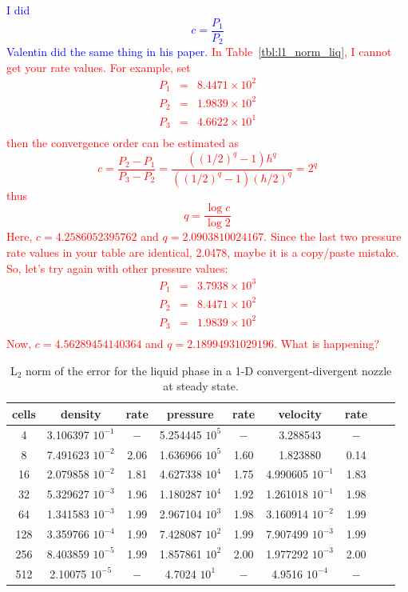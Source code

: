 \documentclass[preprint,10pt]{elsarticle}
\newcommand{\tbl}[1]{Table~\ref{#1}}                     %
\newcommand{\tcr}[1]{\textcolor{red}{#1}}
\newcommand{\tcb}[1]{\textcolor{blue}{#1}}
\begin{document}
%
\tcb{I did 
\begin{equation}
c = \frac{P_1}{P_2}
\end{equation}
Valentin did the same thing in his paper.
}
\tcr{In \tbl{tbl:l1_norm_liq}, I cannot get your rate values. For example, set
\begin{eqnarray*}
P_1 &=& 8.4471 \times 10^{2} \\
P_2 &=& 1.9839 \times 10^{2} \\
P_3 &=& 4.6622 \times 10^{1} \\
\end{eqnarray*}
then the convergence order can be estimated as
\[
c = \frac{P_2-P_1}{P_3-P_2} = \frac{((1/2)^q-1)h^q}{((1/2)^q-1)(h/2)^q}=2^q
\]
thus
\[
q = \frac{\log{c}}{\log{2}}
\]
Here, $c= 4.2586052395762$ and $q=2.0903810024167$. Since the last two pressure rate values in your table are identical, 2.0478, maybe it is a copy/paste mistake. So, let's try again with other pressure values:
\begin{eqnarray*}
P_1 &=& 3.7938 \times 10^{3} \\
P_2 &=& 8.4471 \times 10^{2} \\
P_3 &=& 1.9839 \times 10^{2} \\
\end{eqnarray*}
Now, $c= 4.56289454140364$ and $q=2.18994931029196$. What is happening?
}
%
\begin{table}[H]
\begin{center}
 \caption{\label{tbl:l2_norm_liq} L$_2$ norm of the error for the liquid phase in a 1-D convergent-divergent nozzle at steady state.}
 \begin{tabular}{|c|c|c|c|c|c|c|c|c|}
 \hline
cells& density            & rate & pressure          & rate & velocity           & rate \\ \hline
4    & 3.106397 $10^{-1}$ & $-$  & 5.254445 $10^{5}$ & $-$  & 3.288543           & $-$  \\ \hline
8    & 7.491623 $10^{-2}$ & 2.06 & 1.636966 $10^{5}$ & 1.60 & 1.823880           & 0.14 \\ \hline
16   & 2.079858 $10^{-2}$ & 1.81 & 4.627338 $10^{4}$ & 1.75 & 4.990605 $10^{-1}$ & 1.83 \\ \hline
32   & 5.329627 $10^{-3}$ & 1.96 & 1.180287 $10^{4}$ & 1.92 & 1.261018 $10^{-1}$ & 1.98 \\ \hline
64   & 1.341583 $10^{-3}$ & 1.99 & 2.967104 $10^{3}$ & 1.98 & 3.160914 $10^{-2}$ & 1.99 \\ \hline
128  & 3.359766 $10^{-4}$ & 1.99 & 7.428087 $10^{2}$ & 1.99 & 7.907499 $10^{-3}$ & 1.99 \\ \hline
256  & 8.403859 $10^{-5}$ & 1.99 & 1.857861 $10^{2}$ & 2.00 & 1.977292 $10^{-3}$ & 2.00 \\ \hline
512  & 2.10075  $10^{-5}$ & $-$ & 4.7024   $10^{1}$ & $-$ & 4.9516   $10^{-4}$ & $-$ \\ \hline
\end{tabular}
\end{center}
\end{table}
\end{document}

